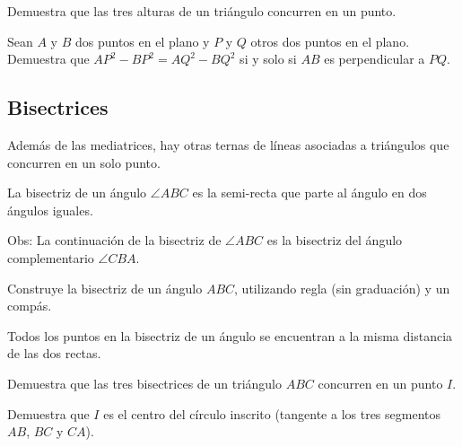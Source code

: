 \begin{ejercicio}
Demuestra que las tres alturas de un triángulo concurren en un punto.
\end{ejercicio}

\begin{ejercicio}
Sean $A$ y $B$ dos puntos en el plano y $P$ y $Q$ otros dos puntos en el plano. Demuestra que $AP^2-BP^2 = AQ^2-BQ^2$ si y solo si $AB$ es perpendicular a $PQ$. 
\end{ejercicio}

\subsection*{Bisectrices}

Además de las mediatrices, hay otras ternas de líneas asociadas a triángulos que concurren en un solo punto.

La bisectriz de un ángulo $\angle ABC$ es la semi-recta que parte al ángulo en dos ángulos iguales.

Obs: La continuación de la bisectriz de $\angle ABC$ es la bisectriz del ángulo complementario $\angle CBA$.

\begin{ejercicio}
Construye la bisectriz de un ángulo $ABC$, utilizando regla (sin graduación) y un compás.
\end{ejercicio}
\vspace{3cm}

Todos los puntos en la bisectriz de un ángulo se encuentran a la misma distancia de las dos rectas. 

\begin{ejercicio}
Demuestra que las tres bisectrices de un triángulo $ABC$ concurren en un punto $I$.


Demuestra que $I$ es el centro del círculo inscrito (tangente a los tres segmentos $AB$, $BC$ y $CA$).
\end{ejercicio}

